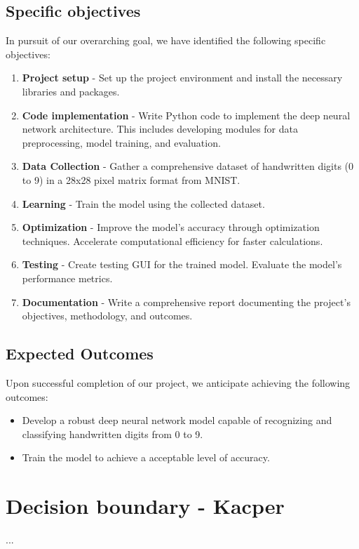 \documentclass{article}
\begin{document}
\subsection{Specific objectives}

In pursuit of our overarching goal, we have identified the following specific objectives:

\begin{enumerate}
    \item \textbf{Project setup} - Set up the project environment and install the necessary libraries and packages.
    \item \textbf{Code implementation} - Write Python code to implement the deep neural network architecture. This includes developing modules for data preprocessing, model training, and evaluation.
    \item \textbf{Data Collection} - Gather a comprehensive dataset of handwritten digits (0 to 9) in a 28x28 pixel matrix format from MNIST.
	\item \textbf{Learning} - Train the model using the collected dataset.
	\item \textbf{Optimization} - Improve the model's accuracy through optimization techniques. Accelerate computational efficiency for faster calculations.
    \item \textbf{Testing} - Create testing GUI for the trained model. Evaluate the model's performance metrics.
	\item \textbf{Documentation} - Write a comprehensive report documenting the project's objectives, methodology, and outcomes.
\end{enumerate}

\subsection{Expected Outcomes}

Upon successful completion of our project, we anticipate achieving the following outcomes:

\begin{itemize}
    \item Develop a robust deep neural network model capable of recognizing and classifying handwritten digits from 0 to 9.
    \item Train the model to achieve a acceptable level of accuracy.
\end{itemize}

\newpage
\section{Decision boundary - Kacper}
...
\end{document}
